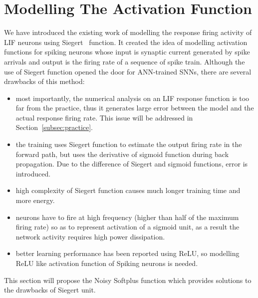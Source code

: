 \section{Modelling The Activation Function}
\label{sec:af_model}
We have introduced the existing work of modelling the response firing activity of LIF neurons using Siegert~\cite{Jug_etal_2012} function.
It created the idea of modelling activation functions for spiking neurons whose input is synaptic current generated by spike arrivals and output is the firing rate of a sequence of spike train.
Although the use of Siegert function opened the door for ANN-trained SNNs, there are several drawbacks of this method:
\begin{itemize}
	\item most importantly, the numerical analysis on an LIF response function is too far from the practice, thus it generates large error between the model and the actual response firing rate.
	This issue will be addressed in Section~\ref{subsec:practice}.
	\item the training uses Siegert function to estimate the output firing rate in the forward path, but uses the derivative of sigmoid function during back propagation.
	Due to the difference of Siegert and sigmoid functions, error is introduced. 
	\item high complexity of Siegert function causes much longer training time and more energy.
	\item neurons have to fire at high frequency (higher than half of the maximum firing rate) so as to represent activation of a sigmoid unit, as a result the network activity requires high power dissipation.
	\item better learning performance has been reported using ReLU, so modelling ReLU like activation function of Spiking neurons is needed.  
\end{itemize}

This section will propose the Noisy Softplus function which provides solutions to the drawbacks of Siegert unit.
